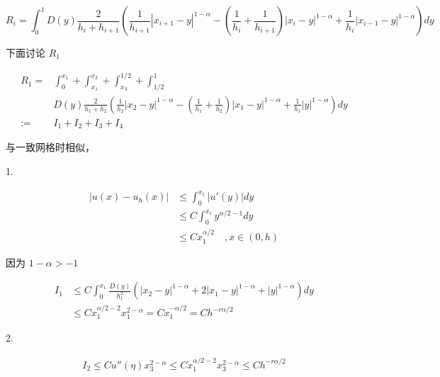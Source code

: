 \documentclass{ctexart}
\begin{document}
\begin{equation}
    R_i = \int_0^1 D(y) \frac{2}{h_i + h_{i+1}} 
    ( \frac{1}{h_{i+1}} |x_{i+1}-y|^{1-\alpha} 
    - (\frac{1}{h_{i}}+\frac{1}{h_{i+1}}) |x_{i}-y|^{1-\alpha}
    +  \frac{1}{h_{i}}|x_{i-1}-y|^{1-\alpha} )  dy 
\end{equation}



下面讨论 \(R_1\)

\begin{equation}
    \begin{aligned}
        R_1 =& \int_0^{x_1} + \int_{x_1}^{x_3} + \int_{x_3}^{1/2} + \int_{1/2}^{1}  \\
        & D(y) \frac{2}{h_1 + h_{2}} 
        ( \frac{1}{h_{2}} |x_{2}-y|^{1-\alpha} 
        - (\frac{1}{h_{1}}+\frac{1}{h_{2}}) |x_{1}-y|^{1-\alpha}
        +  \frac{1}{h_{1}}|y|^{1-\alpha} )  dy \\
        := & I_1 + I_2 + I_3 + I_4
    \end{aligned}
\end{equation}

与一致网格时相似，

1. 

\begin{equation}
    \begin{aligned}
        |u(x) - u_h(x)| &\le \int_0^{x_1} |u'(y)| dy    \\
        &\le C \int_0^{x_1} y^{\alpha/2-1} dy   \\
        &\le C x_1^{\alpha/2}    \quad , x\in (0, h)
    \end{aligned}
\end{equation}

因为 \(1-\alpha > -1\)

\begin{equation}
    \begin{aligned}
        I_1 & \le C \int_0^{x_1} \frac{D(y)}{h_1^2} 
        ( |x_{2}-y|^{1-\alpha} 
        +2 |x_{1}-y|^{1-\alpha}
        +|y|^{1-\alpha} )  dy       \\
        &\le C  x_1^{\alpha/2-2} x_1^{2-\alpha} = C x_1^{-\alpha/2} = C h^{-r\alpha/2}
    \end{aligned}
\end{equation}

2.

\begin{equation}
    \begin{aligned}
        I_2 \le C u''(\eta) x_3^{2-\alpha} \le C x_1^{\alpha/2-2} x_3^{2-\alpha} \le C h^{-r\alpha/2}
    \end{aligned}
\end{equation}
\end{document}
